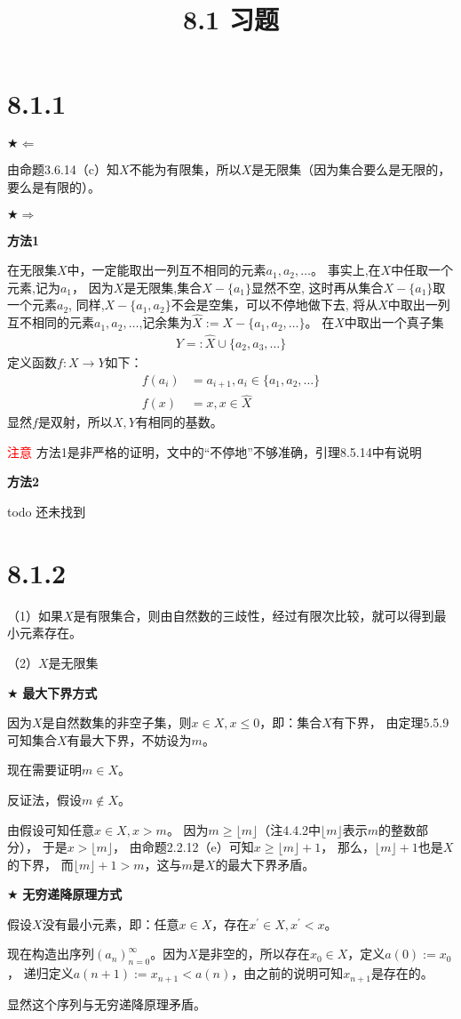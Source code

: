 \documentclass{article}
\theoremstyle{mystyle}
\begin{document}
\title{8.1 习题}
\maketitle

\section*{8.1.1}

$\bigstar \Leftarrow$

由命题3.6.14（c）知$X$不能为有限集，所以$X$是无限集（因为集合要么是无限的，要么是有限的）。


$\bigstar \Rightarrow$

\textbf{方法1}

在无限集$X$中，一定能取出一列互不相同的元素$a_1,a_2,…$。
事实上,在$X$中任取一个元素,记为$a_1$，
因为$X$是无限集,集合$X-\{a_1\}$显然不空,
这时再从集合$X-\{a_1\}$取一个元素$a_2$,
同样,$X-\{a_1, a_2\}$不会是空集，可以不停地做下去,
将从$X$中取出一列互不相同的元素$a_1,a_2,…$,记余集为$\hat{X} := X-\{a_1,a_2,…\}$。
在$X$中取出一个真子集
\begin{align*}
  Y =: \hat{X} \cup \{a_2,a_3,…\}
\end{align*}
定义函数$f: X \rightarrow Y$如下：
\begin{align*}
  f(a_i) & = a_{i+1}, a_i \in \{a_1,a_2,…\} \\
  f(x)   & = x, x \in \hat{X}
\end{align*}
显然$f$是双射，所以$X,Y$有相同的基数。

\textcolor{red}{注意}
方法1是非严格的证明，文中的“不停地”不够准确，引理8.5.14中有说明

\textbf{方法2}

todo 还未找到

\section*{8.1.2}
（1）如果$X$是有限集合，则由自然数的三歧性，经过有限次比较，就可以得到最小元素存在。

（2）$X$是无限集

$\bigstar$ \textbf{最大下界方式}

因为$X$是自然数集的非空子集，则$x \in X, x \leq 0$，即：集合$X$有下界，
由定理5.5.9可知集合$X$有最大下界，不妨设为$m$。

现在需要证明$m \in X$。

反证法，假设$m \not \in X$。

由假设可知任意$x \in X, x > m$。
因为$m \geq \lfloor m \rfloor$（注4.4.2中$\lfloor m \rfloor$表示$m$的整数部分），
于是$x > \lfloor m \rfloor$，
由命题2.2.12（e）可知$x \geq \lfloor m \rfloor + 1$，
那么，$\lfloor m \rfloor + 1$也是$X$的下界，
而$\lfloor m \rfloor + 1 > m$，这与$m$是$X$的最大下界矛盾。

$\bigstar$ \textbf{无穷递降原理方式}

假设$X$没有最小元素，即：任意$x \in X$，存在$x^\prime \in X, x^\prime < x$。

现在构造出序列$(a_n)_{n=0}^\infty$。因为$X$是非空的，所以存在$x_0 \in X$，定义$a(0) := x_0$，
递归定义$a(n+1) := x_{n+1} < a(n)$，由之前的说明可知$x_{n+1}$是存在的。

显然这个序列与无穷递降原理矛盾。
\end{document}
